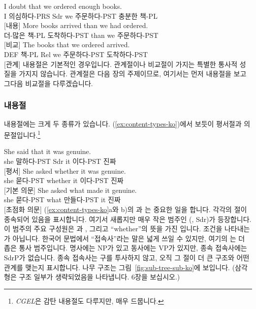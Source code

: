 \ea \label{ex:sub-types-ko}
    \ea \gll I doubt that we ordered enough books.\\
        I 의심하다-PRS Sdr we 주문하다-PST 충분한 책-PL\\
    \glt {} [내용]
    \ex \gll More books arrived than we had ordered.\\
        더-많은 책-PL 도착하다-PST than we 주문하다-PST\\
    \glt {} [비교]
    \ex \gll The books that we ordered arrived.\\
        DEF 책-PL Rel we 주문하다-PST 도착하다-PST\\
    \glt {} [관계]
    \z
\z
내용절은 기본적인 경우입니다. 관계절이나 비교절이 가지는 특별한 통사적 성질을 가지지 않습니다. 관계절은 다음 장의 주제이므로, 여기서는 먼저 내용절을 보고 그다음 비교절을 다루겠습니다.

\subsubsection{내용절}

내용절에는 크게 두 종류가 있습니다. (\ref{ex:content-types-ko})에서 보듯이 평서절과 의문절입니다.\footnote{\textit{CGEL}은 감탄 내용절도 다루지만, 매우 드뭅니다.}

\ea \label{ex:content-types-ko}
    \ea \gll She said that it was genuine.\\
        she 말하다-PST Sdr it 이다-PST 진짜\\
    \glt {} [평서]
    \ex \gll She asked whether it was genuine.\\
        she 묻다-PST whether it 이다-PST 진짜\\
    \glt {} [기본 의문]
    \ex \gll She asked what made it genuine.\\
        she 묻다-PST what 만들다-PST it 진짜\\
    \glt {} [초점화 의문]
    \z
\z
(\ref{ex:content-types-ko}a와 b)의 과 는 중요한 일을 합니다. 각각의 절이 종속되어 있음을 표시합니다. 여기서 새롭지만 매우 작은 범주인 (, Sdr)가 등장합니다. 이 범주의 주요 구성원은 과 , 그리고 \enquote{whether}의 뜻을 가진 입니다. 조건을 나타내는 가 아닙니다. 한국어 문법에서 \enquote{접속사}라는 말은 넓게 쓰일 수 있지만, 여기의 는 더 좁은 통사 범주입니다. 명사에는 NP가 있고 동사에는 VP가 있지만, 종속 접속사에는 SdrP가 없습니다. 종속 접속사는 구를 투사하지 않고, 오직 그 절이 더 큰 구조와 어떤 관계를 맺는지 표시합니다. 나무 구조는 그림~\ref{fig:sub-tree-sub-ko}에 보입니다. (삼각형은 구조 일부가 생략되었음을 나타냅니다. 6장을 보십시오.)

